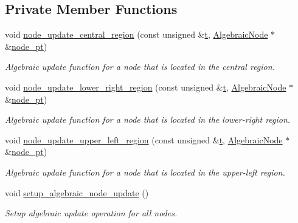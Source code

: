 \subsection*{Private Member Functions}
\begin{DoxyCompactItemize}
\item 
void \hyperlink{classoomph_1_1AlgebraicRefineableQuarterTubeMesh_a064653020f5d2a0c7de789283dac305c}{node\+\_\+update\+\_\+central\+\_\+region} (const unsigned \&\hyperlink{cfortran_8h_af6f0bd3dc13317f895c91323c25c2b8f}{t}, \hyperlink{classoomph_1_1AlgebraicNode}{Algebraic\+Node} $\ast$\&\hyperlink{classoomph_1_1AlgebraicMesh_aedeebbe95d2f8e67e9939cecd1be3933}{node\+\_\+pt})
\begin{DoxyCompactList}\small\item\em Algebraic update function for a node that is located in the central region. \end{DoxyCompactList}\item 
void \hyperlink{classoomph_1_1AlgebraicRefineableQuarterTubeMesh_a52fb1161ebff25b5c638ac35cb541817}{node\+\_\+update\+\_\+lower\+\_\+right\+\_\+region} (const unsigned \&\hyperlink{cfortran_8h_af6f0bd3dc13317f895c91323c25c2b8f}{t}, \hyperlink{classoomph_1_1AlgebraicNode}{Algebraic\+Node} $\ast$\&\hyperlink{classoomph_1_1AlgebraicMesh_aedeebbe95d2f8e67e9939cecd1be3933}{node\+\_\+pt})
\begin{DoxyCompactList}\small\item\em Algebraic update function for a node that is located in the lower-\/right region. \end{DoxyCompactList}\item 
void \hyperlink{classoomph_1_1AlgebraicRefineableQuarterTubeMesh_ac82a39ccaed8016a9b1e841d91658a75}{node\+\_\+update\+\_\+upper\+\_\+left\+\_\+region} (const unsigned \&\hyperlink{cfortran_8h_af6f0bd3dc13317f895c91323c25c2b8f}{t}, \hyperlink{classoomph_1_1AlgebraicNode}{Algebraic\+Node} $\ast$\&\hyperlink{classoomph_1_1AlgebraicMesh_aedeebbe95d2f8e67e9939cecd1be3933}{node\+\_\+pt})
\begin{DoxyCompactList}\small\item\em Algebraic update function for a node that is located in the upper-\/left region. \end{DoxyCompactList}\item 
void \hyperlink{classoomph_1_1AlgebraicRefineableQuarterTubeMesh_a2d0312615834a2aec8d0d6d4e2c846ef}{setup\+\_\+algebraic\+\_\+node\+\_\+update} ()
\begin{DoxyCompactList}\small\item\em Setup algebraic update operation for all nodes. \end{DoxyCompactList}\item 

\end{DoxyCompactItemize}
